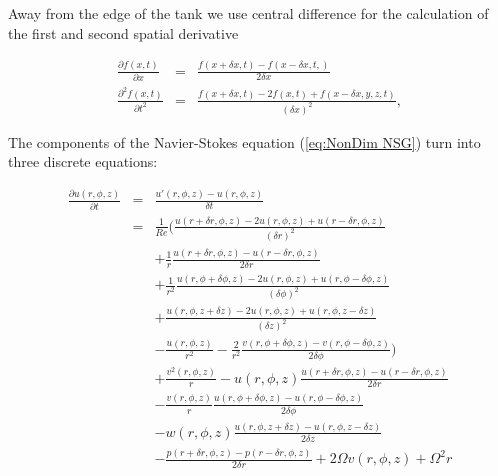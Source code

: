 \documentclass[12pt, a4paper, twoside]{article}
\begin{document}
		Away from the edge of the tank we use central difference for the calculation of the first and second spatial derivative %
		
		\begin{eqnarray}
			\frac{\partial f(x,t)}{\partial x} &=& \frac{f(x + \delta x,t) - f(x - \delta x,t,)}{2\delta x}
			\label{eq:CentrDiv Space}
			\\
			\frac{\partial^2 f(x,t)}{\partial t^2} &=& \frac{f(x+\delta x,t) - 2f(x,t) + f(x - \delta x,y,z,t)}{\left(\delta x\right)^2} ,
			\label{eq:2CentrDiv Space}
		\end{eqnarray}
		
		The components of the Navier-Stokes equation (\ref{eq:NonDim NSG}) turn into three discrete equations:
		
		\begin{eqnarray}
			\frac{\partial u(r,\phi,z)}{\partial t} &=& \frac{u'(r,\phi,z)- u(r,\phi,z)}{\delta t}
			\nonumber \\
			&=& \frac{1}{Re} \bigg( \frac{u(r+\delta r,\phi,z)-2u(r,\phi,z)+u(r-\delta r,\phi,z)}{(\delta r)^2}
			\nonumber \\
							&&	+ \frac{1}{r}\frac{u(r+\delta r,\phi,z)-u(r-\delta r,\phi,z)}{2\delta r}
			\nonumber \\
							&&	+ \frac{1}{r^2}\frac{u(r,\phi+\delta\phi,z)-2u(r,\phi,z)+u(r,\phi-\delta\phi,z)}{(\delta \phi)^2}
			\nonumber \\
							&&	+ \frac{u(r,\phi,z+\delta z)-2u(r,\phi,z)+u(r,\phi,z-\delta z)}{(\delta z)^2}
			\nonumber \\
							&&	- \frac{u(r,\phi, z)}{r^2}
								- \frac{2}{r^2}\frac{v(r,\phi+\delta\phi,z)-v(r,\phi-\delta\phi,z)}{2\delta\phi} \bigg)
			\nonumber \\
			&&	+ \frac{v^2(r,\phi,z)}{r}
				- u(r,\phi,z)\frac{u(r+\delta r,\phi,z)-u(r-\delta r,\phi,z)}{2\delta r}
			\nonumber \\
			&&	- \frac{v(r,\phi,z)}{r}\frac{u(r,\phi+\delta\phi,z)-u(r,\phi-\delta\phi,z)}{2\delta\phi}
			\nonumber \\
			&&	- w(r,\phi,z)\frac{u(r,\phi,z+\delta z)-u(r,\phi,z-\delta z)}{2\delta z}
			\nonumber \\
			&&	- \frac{p(r+\delta r,\phi, z)-p(r-\delta r,\phi,z)}{2\delta r}
				+ 2\Omega v(r,\phi,z)
				+ \Omega^2 r
			\label{eq:discrete u}
		\end{eqnarray}
		
\end{document}
